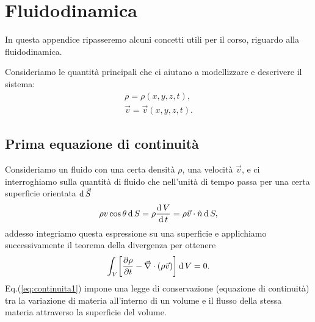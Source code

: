 \chapterspaceabove{6.75cm} %
\chapterspacebelow{7.25cm} %


\chapter{Fluidodinamica}\label{chap:app1}

In questa appendice ripasseremo alcuni concetti utili per il corso, riguardo alla fluidodinamica.

Consideriamo le quantità principali che ci aiutano a modellizzare e descrivere il sistema:
\begin{gather*}
    \rho = \rho(x, y, z, t),\\
    \vec{v} = \vec{v}(x, y, z, t).
\end{gather*}

\section{Prima equazione di continuità}
Consideriamo un fluido con una certa densità $\rho$, una velocità $\vec{v}$, e ci interroghiamo sulla quantità di fluido che nell'unità di tempo passa per una certa superficie orientata $\operatorname{d} \vec{S}$
\begin{equation*}
    \rho v \cos \theta \operatorname{d} S = \rho \frac{\operatorname{d} V}{\operatorname{d} t} = \rho \vec{v}\cdot \hat{n} \operatorname{d} S,
\end{equation*}
addesso integriamo questa espressione su una superficie e applichiamo successivamente il teorema della divergenza per ottenere
\begin{equation}
    \int_V \biggl[ \frac{\partial \rho}{\partial t} - \vec{\nabla} \cdot (\rho \vec{v}) \biggr] \operatorname{d} V = 0. \label{eq:continuita1}
\end{equation}
Eq.(\ref{eq:continuita1}) impone una legge di conservazione (equazione di continuità) tra la variazione di materia all'interno di un volume e il flusso della stessa materia attraverso la superficie del volume.

